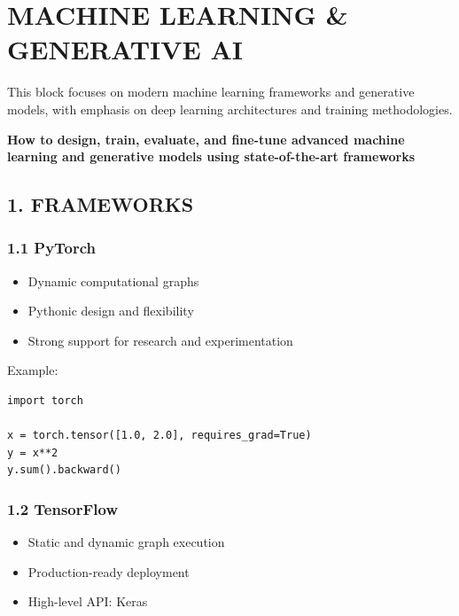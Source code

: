 \chapter{MACHINE LEARNING \& GENERATIVE AI}

This block focuses on modern machine learning frameworks and generative models, with emphasis on deep learning architectures and training methodologies.

\begin{center}
\textbf{How to design, train, evaluate, and fine-tune advanced machine learning and generative models using state-of-the-art frameworks}
\end{center}

\vspace{0.5cm}

\section*{1. FRAMEWORKS}

\subsection*{1.1 PyTorch}

\begin{itemize}
\item Dynamic computational graphs
\item Pythonic design and flexibility
\item Strong support for research and experimentation
\end{itemize}

Example:

\begin{verbatim}
import torch

x = torch.tensor([1.0, 2.0], requires_grad=True)
y = x**2
y.sum().backward()
\end{verbatim}

\subsection*{1.2 TensorFlow}

\begin{itemize}
\item Static and dynamic graph execution
\item Production-ready deployment
\item High-level API: Keras
\end{itemize}


